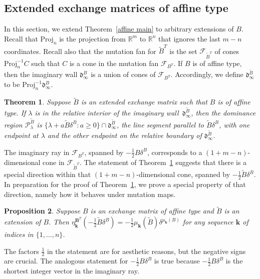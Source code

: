 \documentclass{amsart}
\newtheorem{proposition}{Proposition}[section]
\newtheorem{theorem}[proposition]{Theorem}
\theoremstyle{definition}
\theoremstyle{remark}
\numberwithin{equation}{section}
\newcommand{\reals}{\mathbb R}
\newcommand{\set}[1]{{\lbrace #1 \rbrace}}
\newcommand{\F}{{\mathcal F}}
\newcommand{\0}{{\mathbf{0}}}
\newcommand{\Proj}{\mathrm{Proj}}
\newcommand{\kk}{{\boldsymbol{k}}}
\newcommand{\tB}{{\widetilde{B}}}
\newcommand{\BB}{\mathbf{B}}
\renewcommand{\P}{\mathcal{P}}
\renewcommand{\d}{{\mathfrak d}}
\begin{document}
\subsection{Extended exchange matrices of affine type}
In this section, we extend Theorem~\ref{affine main} to arbitrary extensions of $B$.  
Recall that $\Proj_n$ is the projection from $\reals^m$ to $\reals^n$ that ignores the last $m-n$ coordinates.
Recall also that the mutation fan for $\tB^T$ is the set $\F_{\tB^T}$ of cones $\Proj_n^{-1}C$ such that $C$ is a cone in the mutation fan $\F_{B^T}$.
If $B$ is of affine type, then the imaginary wall $\d_\infty^B$ is a union of cones of $\F_{B^T}$.
Accordingly, we define $\d_\infty^\tB$ to be $\Proj_n^{-1}\d_\infty^B$.

\begin{theorem}\label{affine main extended}
Suppose $\tB$ is an extended exchange matrix such that $B$ is of affine type.
If $\lambda$ is in the relative interior of the imaginary wall~$\d^\tB_\infty$, then the dominance region $\P^\tB_\lambda$ is $\set{\lambda+a\tB\delta^B:a\ge0}\cap\d^\tB_\infty$, the line segment parallel to $\tB\delta^B$, with one endpoint at $\lambda$ and the other endpoint on the relative boundary of $\d^\tB_\infty$.
\end{theorem}

The imaginary ray in $\F_{B^T}$, spanned by $-\frac12B\delta^B$, corresponds to a $(1+m-n)$-dimensional cone in $\F_{\tB^T}$.
The statement of Theorem~\ref{affine main extended} suggests that there is a special direction within that $(1+m-n)$-dimensional cone, spanned by $-\frac12\tB\delta^B$.
In preparation for the proof of Theorem~\ref{affine main extended}, we prove a special property of that direction, namely how it behaves under mutation maps.

\begin{proposition}\label{delta is the tilde man}
Suppose $B$ is an exchange matrix of affine type and $\tB$ is an extension of $B$.
Then $\eta^{\BB^T}_\kk(-\frac12\tB\delta^B)=-\frac12\mu_\kk(\tB)\delta^{\mu_\kk(B)}$ for any sequence $\kk$ of indices in $\set{1,\ldots,n}$.
\end{proposition}
The factors $\frac12$ in the statement are for aesthetic reasons, but the negative signs are crucial.
The analogous statement for $-\frac12B\delta^B$ is true because $-\frac12B\delta^B$ is the shortest integer vector in the imaginary ray.
\end{document}
